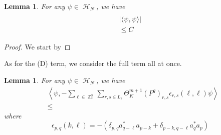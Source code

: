 \documentclass[sn-mathphys, Numbered ,a4paper]{sn-jnl}%
\DeclareMathOperator{\Z}{\mathbb{Z}}
\DeclareMathOperator{\HH}{\mathcal{H}}
\newcommand{\eva}[1]{\left\langle #1 \right\rangle}
\theoremstyle{plain}
\newtheorem{lemma}[theorem]{Lemma}
\theoremstyle{definition}
\theoremstyle{remark}
\theoremstyle{plain}
\theoremstyle{definition}
\theoremstyle{remark}
\begin{document}
\begin{lemma}
	For any $\psi \in \HH_N$, we have
	\begin{align}
		&\abs{\eva{\psi,   \psi}}\nonumber\\&\leq C
	\end{align}
\end{lemma}
\begin{proof}
	We start by
\end{proof}


As for the (D) term, we consider the full term all at once.
\begin{lemma}
    For any $\psi \in \HH_N$, we have
    \begin{align}
     &\eva{\psi,-\sum\limits_{\ell \in \Z^3_*}\sum\limits_{r,s \in L_{\ell}}\Theta^{m+1}_K(P^q)_{r,s}\epsilon_{r,s}(\ell,\ell)\psi }\nonumber\\ 
     &\leq 
    \end{align}
    where
   \begin{equation}
       \epsilon_{p,q}(k,\ell) = -\left(\delta_{p,q}a^*_{q-\ell}a_{p-k} + \delta_{p-k,q-\ell}a^*_{q}a_{p}\right)
   \end{equation}
\end{lemma}
\end{document}
